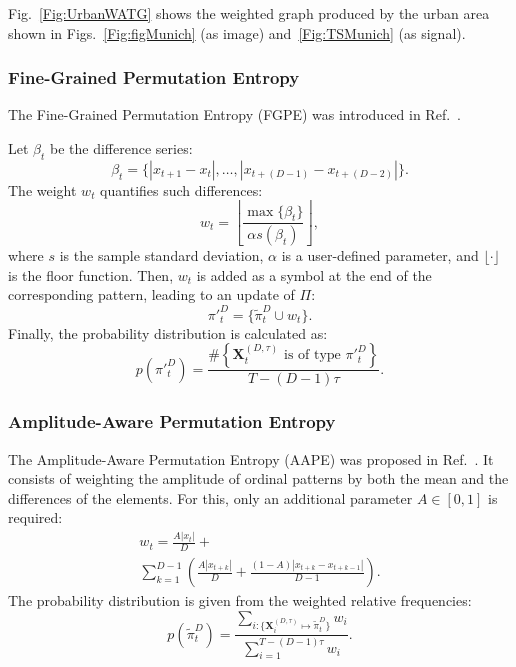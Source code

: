 \documentclass[journal]{IEEEtran}
\begin{document}
Fig.~\ref{Fig:UrbanWATG} shows the weighted graph produced by the urban area shown in Figs.~\ref{Fig:figMunich} (as image) and~\ref{Fig:TSMunich} (as signal).

\subsubsection{Fine-Grained Permutation Entropy}\label{FGPE}

The Fine-Grained Permutation Entropy (FGPE) was introduced in Ref.~\cite{xiao2009fine}.

Let $\beta_t$ be the difference series:
\begin{equation}
\beta_t = \big\{|x_{t+1} - x_t|, \dots, |x_{t+(D-1)} - x_{t+(D-2)}|\big\}.
\end{equation}
The weight $w_t$ quantifies such differences:
\begin{equation}
w_t = \left \lfloor \frac{\max\{\beta_t\}}{\alpha s(\beta_t) } \right \rfloor,
\end{equation}
where $s$ is the sample standard deviation,
$\alpha$ is a user-defined parameter, 
and $\lfloor\cdot \rfloor$ is the floor function.
Then, $w_t$ is added as a symbol at the end of the corresponding pattern, leading to an update of $\Pi$:
\begin{equation}
\pi{'}_t^D = \{ \widetilde \pi_t^D \cup w_t\}.
\end{equation} 
Finally, the probability distribution is calculated as:
\begin{equation}
p(\pi{'}_t^D) = \frac{\#\left \{\mathbf{X}_t^{(D,\tau)} \text{ is of type } \pi{'}_t^D\right \}}{T- (D-1)\tau}.
\end{equation}

\subsubsection{Amplitude-Aware Permutation Entropy}\label{AAPE}

The Amplitude-Aware Permutation Entropy (AAPE) was proposed in Ref.~\cite{azami2016amplitude}.
It consists of weighting the amplitude of ordinal patterns by both the mean and the differences of the elements.
For this, only an additional parameter $ A \in [0, 1]$ is required:
\begin{multline}
w_t = \frac{A  |x_t|}{D} + \\ \sum_{k = 1}^{D - 1} \left(\frac{A  |x_{t + k}|}{D} + \frac{(1 - A)  |x_{t+k} - x_{t+k-1}|}{D - 1}\right).
\end{multline}
The probability distribution is given from the weighted relative frequencies:
\begin{equation}
p(\widetilde \pi_t^D) = \frac{\sum_{i : \{\mathbf{X}^{(D,\tau)}_i \mapsto \widetilde\pi^D_t\}} w_{i}}{\sum_{i = 1}^{T-(D-1)\tau} w_{i}}.
\end{equation}
\end{document}
